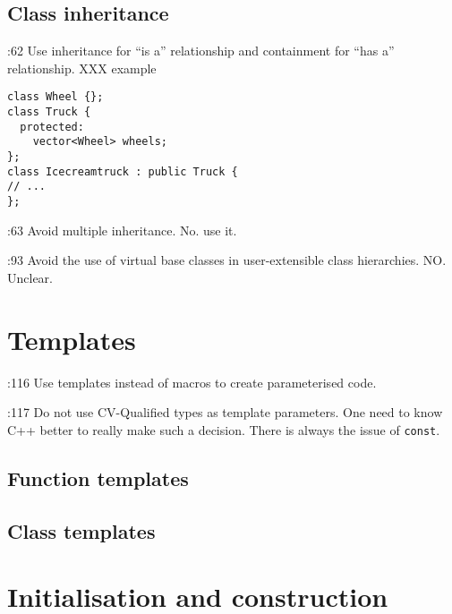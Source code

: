 \documentclass{book}
\newcommand{\name}[1]{\texttt{#1}}
\begin{document}
\section{Class inheritance}
\label{sec:ClassInheritance}

\cite{OKL_MisfeldtBumgardnerGray2004CppStyle}:62 Use inheritance for ``is a'' relationship and containment for ``has a'' relationship. XXX example 

\begin{verbatim}
class Wheel {};
class Truck {
  protected:
    vector<Wheel> wheels;
};
class Icecreamtruck : public Truck {
// ...
};
\end{verbatim}

\cite{OKL_MisfeldtBumgardnerGray2004CppStyle}:63 Avoid multiple inheritance. No. use it.

\cite{OKL_MisfeldtBumgardnerGray2004CppStyle}:93 Avoid the use of virtual base classes in user-extensible class hierarchies. NO. Unclear.  










\chapter{Templates}
\label{cha:Templates}

\cite{OKL_MisfeldtBumgardnerGray2004CppStyle}:116 Use templates instead of macros to create parameterised code. 

\cite{OKL_MisfeldtBumgardnerGray2004CppStyle}:117 Do not use CV-Qualified types as template parameters. One need to know C++ better to really make such a decision. There is always the issue of \name{const}.  






\section{Function templates}
\label{sec:FuncTemplates}



\section{Class templates}
\label{sec:ClassTemplates}




\chapter{Initialisation and construction}
\label{cha:Initialisation}
\end{document}
